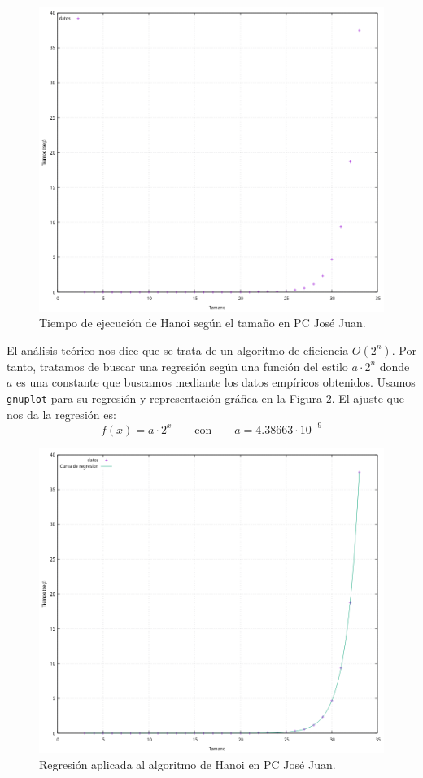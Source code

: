 \documentclass[12pt]{article}
\begin{document}
    \begin{figure}
        \centering
        \includegraphics[width=0.8\linewidth]{images/Hanoi/hanoi-puntos.png}
        \caption{Tiempo de ejecución de Hanoi según el tamaño en PC José Juan.}
        \label{fig:hanoi_puntos}
    \end{figure}

    El análisis teórico nos dice que se trata de un algoritmo de eficiencia $O(2^n)$. Por tanto, tratamos de buscar una regresión según una función del estilo $a \cdot 2^{n}$ donde $a$ es una constante que buscamos mediante los datos empíricos obtenidos. Usamos \verb|gnuplot| para su regresión y representación gráfica en la Figura \ref{fig:hanoi_regresion}.
    El ajuste que nos da la regresión es:
    $$f(x)=a \cdot 2^{x} \qquad \text{con} \qquad a = 4.38663 \cdot 10^{-9} $$
    
    \begin{figure}
        \centering
        \includegraphics[width=.8\linewidth]{images/Hanoi/hanoi-regresion.png}
        \caption{Regresión aplicada al algoritmo de Hanoi en PC José Juan.}
        \label{fig:hanoi_regresion}
    \end{figure}
 
\end{document}
